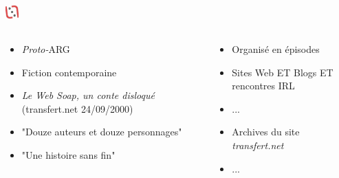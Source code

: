 \documentclass[slidetop,11pt]{beamer}
\def\moreInFrameTitleLeftt{\includegraphics[height=0.5cm]{img/ligueludique-0.png}~~~~~}
\begin{document}
\subsubsection{\sectionPartIIaVII}
\begin{frame}
	\frametitle{\moreInFrameTitleLeftt \sectionPartIIaVII }
	\begin{columns}[T]
		\begin{column}[T]{5.00cm}
			\begin{itemize}
				\item \emph{Proto-}ARG
				\item Fiction contemporaine
				\item \emph{Le Web Soap, un conte disloqu{\'e}} (transfert.net 24/09/2000)
				\item "Douze auteurs et douze personnages"
				\item "Une histoire sans fin"
			\end{itemize}
		\end{column}
		\begin{column}[T]{5.00cm}
			\begin{itemize}
				\item Organis{\'e} en {\'e}pisodes
				\item Sites Web ET Blogs ET rencontres IRL
				\item ...
				\item Archives du site \emph{transfert.net}
				\item ...
			\end{itemize}
		\end{column}
	\end{columns}
\end{frame} 


\def\sectionPartIIaVIII{Resistance Radio}
\end{document}
